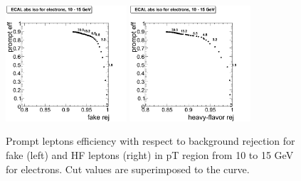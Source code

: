 \begin{figure}[htbp]
\begin{center}
 \includegraphics[width = 0.4\textwidth]{pictures/trackCut/bkgdRej_sigEff/elec_fake_ptCut1_ptCut2.png}
\includegraphics[width = 0.4\textwidth]{pictures/trackCut/bkgdRej_sigEff/elec_nonPrompt_ptCut1_ptCut2.png}
\caption{\small{Prompt leptons efficiency with respect to background 
rejection for fake (left) and HF leptons (right) in pT region
from 10 to 15 GeV for electrons. 
Cut values are superimposed to the curve.}\label{fig:ecalrej_el2}}
\end{center}
\end{figure}

